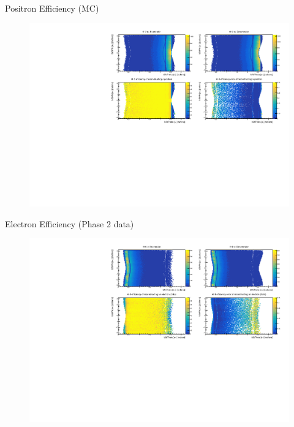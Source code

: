 \documentclass[10pt]{beamer}
\begin{document}
\begin{frame}{Positron Efficiency (MC)}
	
	\begin{figure}
		\centering
		\includegraphics[width=\textwidth]{Plots/Eff/TPepEff}
	\end{figure}
	
\end{frame}


\begin{frame}{Electron Efficiency (Phase 2 data)}
	
	\begin{figure}
		\centering
		\includegraphics[width=\textwidth]{Plots/Eff/TPemEff_Data}
	\end{figure}
	
\end{frame}
\end{document}
